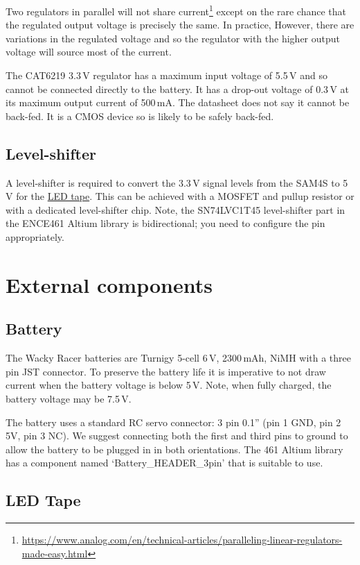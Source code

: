 Two regulators in parallel will not share
current\footnote{\url{https://www.analog.com/en/technical-articles/paralleling-linear-regulators-made-easy.html}}
except on the rare chance that the regulated output voltage is
precisely the same.  In practice, However, there are variations in the
regulated voltage and so the regulator with the higher output voltage
will source most of the current.

The CAT6219 3.3\,V regulator has a maximum input voltage of 5.5\,V and
so cannot be connected directly to the battery.  It has a drop-out
voltage of 0.3\,V at its maximum output current of 500\,mA.  The
datasheet does not say it cannot be back-fed.  It is a CMOS device so
is likely to be safely back-fed.


\subsection{Level-shifter}\label{level-shifter}

A level-shifter is required to convert the 3.3\,V signal levels from
the SAM4S to 5\,V for the \hyperref[LED-tape]{LED tape}.  This can be
achieved with a MOSFET and pullup resistor or with a dedicated
level-shifter chip.  Note, the SN74LVC1T45 level-shifter part in the
ENCE461 Altium library is bidirectional; you need to configure the
 pin appropriately.



\section{External components}

\subsection{Battery}

The Wacky Racer batteries are Turnigy 5-cell 6\,V, 2300\,mAh, NiMH
with a three pin JST connector.  To preserve the battery life it is
imperative to not draw current when the battery voltage is below 5\,V.
Note, when fully charged, the battery voltage may be 7.5\,V.

The battery uses a standard RC servo connector: 3 pin 0.1'' (pin 1
GND, pin 2 5V, pin 3 NC). We suggest connecting both the first and
third pins to ground to allow the battery to be plugged in in both
orientations. The 461 Altium library has a component named
`Battery\_HEADER\_3pin' that is suitable to use.

\subsection{LED Tape}
\label{LED-tape}

